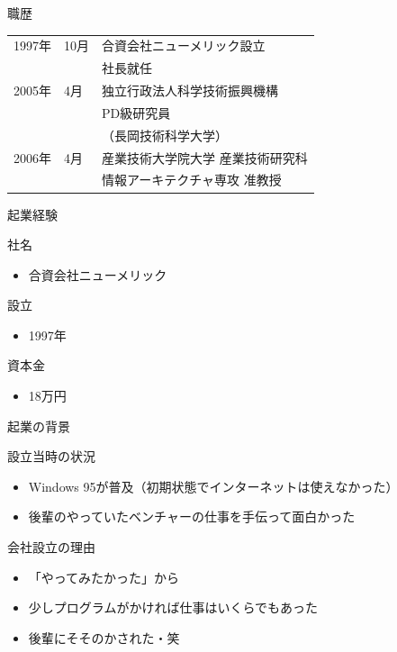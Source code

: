 \documentclass[12pt, t, aspectratio=169]{beamer}
\begin{document}
\begin{frame}[label=sec-1-1-4]{職歴}
\begin{center}
\begin{tabular}{lll}
1997年 & 10月 & 合資会社ニューメリック設立\\
 &  & \alert{社長就任}\\
2005年 & 4月 & 独立行政法人科学技術振興機構\\
 &  & PD級研究員\\
 &  & （長岡技術科学大学）\\
2006年 & 4月 & 産業技術大学院大学 産業技術研究科\\
 &  & 情報アーキテクチャ専攻 准教授\\
\end{tabular}
\end{center}
\end{frame}
\begin{frame}[label=sec-1-1-5]{起業経験}
\begin{block}{社名}
\begin{itemize}
\item 合資会社ニューメリック
\end{itemize}
\end{block}
\begin{block}{設立}
\begin{itemize}
\item 1997年
\end{itemize}
\end{block}
\begin{block}{資本金}
\begin{itemize}
\item \alert{18万円}
\end{itemize}
\end{block}
\end{frame}
\begin{frame}[label=sec-1-1-6]{起業の背景}
\begin{block}{設立当時の状況}
\begin{itemize}
\item Windows 95が普及（初期状態でインターネットは使えなかった）
\item 後輩のやっていたベンチャーの仕事を手伝って面白かった
\end{itemize}
\end{block}
\begin{block}{会社設立の理由}
\begin{itemize}
\item 「やってみたかった」から
\item 少しプログラムがかければ仕事はいくらでもあった
\item 後輩にそそのかされた・笑
\end{itemize}
\end{block}
\end{frame}
\end{document}
